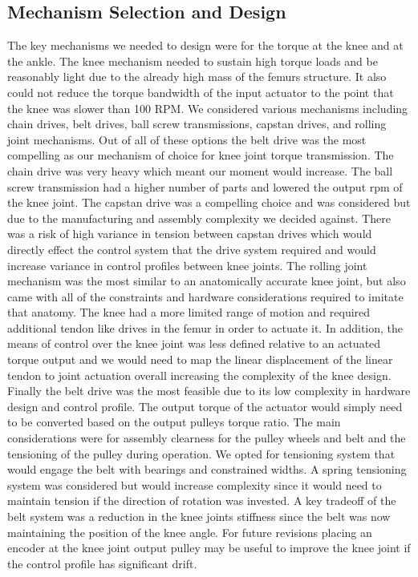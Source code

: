 \documentclass{article}
\begin{document}
\subsection{Mechanism Selection and Design}
The key mechanisms we needed to design were for the torque at the knee and at the ankle. The knee mechanism needed to sustain high torque loads and be reasonably light due to the already high mass of the femurs structure. It also could not reduce the torque bandwidth of the input actuator to the point that the knee was slower than 100 RPM. We considered various mechanisms including chain drives, belt drives, ball screw transmissions, capstan drives, and rolling joint mechanisms. Out of all of these options the belt drive was the most compelling as our mechanism of choice for knee joint torque transmission. The chain drive was very heavy which meant our moment would increase. The ball screw transmission had a higher number of parts and lowered the output rpm of the knee joint. The capstan drive was a compelling choice and was considered but due to the manufacturing and assembly complexity we decided against. There was a risk of high variance in tension between capstan drives which would directly effect the control system that the drive system required and would increase variance in control profiles between knee joints. The rolling joint mechanism was the most similar to an anatomically accurate knee joint, but also came with all of the constraints and hardware considerations required to imitate that anatomy. The knee had a more limited range of motion and required additional tendon like drives in the femur in order to actuate it. In addition, the means of control over the knee joint was less defined relative to an actuated torque output and we would need to map the linear displacement of the linear tendon to joint actuation overall increasing the complexity of the knee design. Finally the belt drive was the most feasible due to its low complexity in hardware design and control profile. The output torque of the actuator would simply need to be converted based on the output pulleys torque ratio. The main considerations were for assembly clearness for the pulley wheels and belt and the tensioning of the pulley during operation. We opted for tensioning system that would engage the belt with bearings and constrained widths. A spring tensioning system was considered but would increase complexity since it would need to maintain tension if the direction of rotation was invested. A key tradeoff of the belt system was a reduction in the knee joints stiffness since the belt was now maintaining the position of the knee angle. For future revisions placing an encoder at the knee joint output pulley may be useful to improve the knee joint if the control profile has significant drift. 
\end{document}
